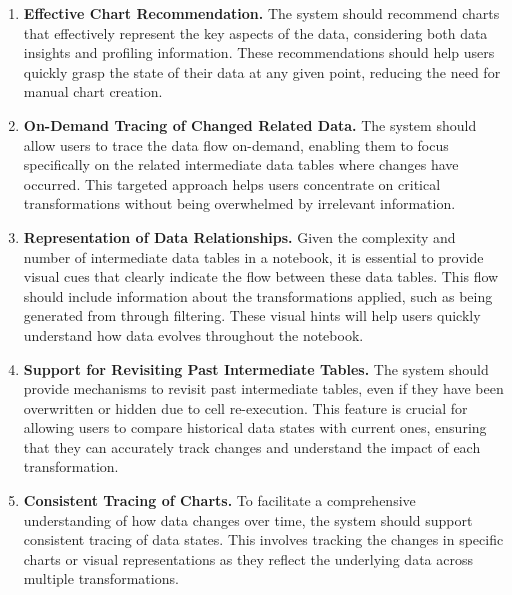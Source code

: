 \begin{enumerate}[label={\textbf{R\arabic*.}}]

    \item \textbf{Effective Chart Recommendation.}
    The system should recommend charts that effectively represent the key aspects of the data, considering both data insights and profiling information. These recommendations should help users quickly grasp the state of their data at any given point, reducing the need for manual chart creation.

    \item \textbf{On-Demand Tracing of Changed Related Data.} The system should allow users to trace the data flow on-demand, enabling them to focus specifically on the related intermediate data tables where changes have occurred. This targeted approach helps users concentrate on critical transformations without being overwhelmed by irrelevant information.
    
    \item \textbf{Representation of Data Relationships.}
    Given the complexity and number of intermediate data tables in a notebook, it is essential to provide visual cues that clearly indicate the flow between these data tables. 
    This flow should include information about the transformations applied, such as  being generated from  through filtering. These visual hints will help users quickly understand how data evolves throughout the notebook.
    
    \item \textbf{Support for Revisiting Past Intermediate Tables.} The system should provide mechanisms to revisit past intermediate tables, even if they have been overwritten or hidden due to cell re-execution. This feature is crucial for allowing users to compare historical data states with current ones, ensuring that they can accurately track changes and understand the impact of each transformation. 

    \item \textbf{Consistent Tracing of Charts.} 
    To facilitate a comprehensive understanding of how data changes over time, the system should support consistent tracing of data states. This involves tracking the changes in specific charts or visual representations as they reflect the underlying data across multiple transformations. 
\end{enumerate}
